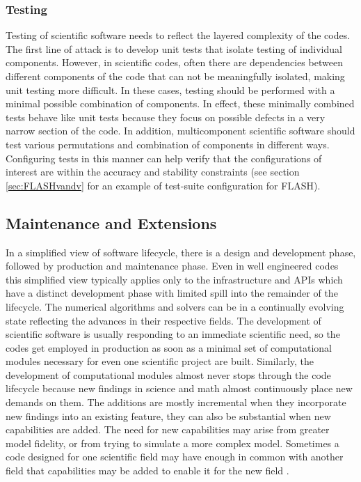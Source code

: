 \subsubsection{Testing}
\label{sec:testing}
Testing of scientific software needs to reflect the layered complexity of
the codes. The first line of attack is to develop 
unit tests that isolate testing of individual components. However, in
scientific codes, often there are dependencies between 
different components of the code that can not be meaningfully
isolated, making unit testing more difficult. In these cases, testing
should be performed with a minimal possible combination of components.  In
effect, these minimally combined tests behave like unit tests because they focus on possible
defects in a very narrow section of the code. In addition,
multicomponent scientific software should test various  permutations and
combination of components in different ways. Configuring tests in this
manner can help verify that the configurations of interest are within the
accuracy and stability constraints (see section
\ref{sec:FLASHvandv} for an example of test-suite configuration for FLASH).   

\subsection{Maintenance and Extensions}
\label{sec:maintain}
In a simplified view of software lifecycle, there is a design and development phase,
followed by production and maintenance phase.  Even in well engineered
codes this simplified view typically applies only to the
infrastructure and APIs which have a distinct development phase with
limited spill into the remainder of the lifecycle. The numerical 
algorithms and solvers can be in a continually evolving state
reflecting the advances in their respective fields.  
The development of scientific software is usually responding to an immediate
scientific need, so the codes get employed in production as soon as a
minimal set of computational modules necessary for even one scientific
project are built.  Similarly, the development of computational
modules almost never stops through the code lifecycle because new
findings in science and math almost continuously place new demands on
them. The additions are mostly incremental when they incorporate new
findings into an existing feature, they can also be substantial when
new capabilities are added. The need for new capabilities may arise
from  greater model fidelity, or from trying to simulate a more
complex model. Sometimes a code designed for one scientific field may
have enough in common with another field that capabilities may be
added to enable it for the new field \cite{Dubey2016Pasc}.    


